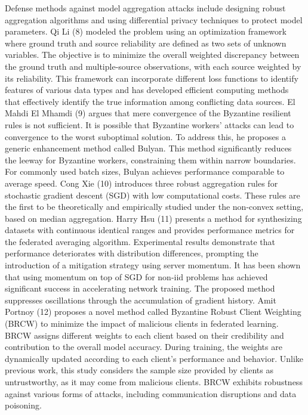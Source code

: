 \documentclass[conference]{IEEEtran}
\begin{document}
Defense methods against model aggregation attacks include designing robust aggregation algorithms and using differential privacy techniques to protect model parameters.
Qi Li (8) modeled the problem using an optimization framework where ground truth and source reliability are defined as two sets of unknown variables. The objective is to minimize the overall weighted discrepancy between the ground truth and multiple-source observations, with each source weighted by its reliability. This framework can incorporate different loss functions to identify features of various data types and has developed efficient computing methods that effectively identify the true information among conflicting data sources.
El Mahdi El Mhamdi (9) argues that mere convergence of the Byzantine resilient rules is not sufficient. It is possible that Byzantine workers' attacks can lead to convergence to the worst suboptimal solution. To address this, he proposes a generic enhancement method called Bulyan. This method significantly reduces the leeway for Byzantine workers, constraining them within narrow boundaries. For commonly used batch sizes, Bulyan achieves performance comparable to average speed.
Cong Xie (10) introduces three robust aggregation rules for stochastic gradient descent (SGD) with low computational costs. These rules are the first to be theoretically and empirically studied under the non-convex setting, based on median aggregation.
Harry Hsu (11) presents a method for synthesizing datasets with continuous identical ranges and provides performance metrics for the federated averaging algorithm. Experimental results demonstrate that performance deteriorates with distribution differences, prompting the introduction of a mitigation strategy using server momentum. It has been shown that using momentum on top of SGD for non-iid problems has achieved significant success in accelerating network training. The proposed method suppresses oscillations through the accumulation of gradient history.
Amit Portnoy (12) proposes a novel method called Byzantine Robust Client Weighting (BRCW) to minimize the impact of malicious clients in federated learning. BRCW assigns different weights to each client based on their credibility and contribution to the overall model accuracy. During training, the weights are dynamically updated according to each client's performance and behavior. Unlike previous work, this study considers the sample size provided by clients as untrustworthy, as it may come from malicious clients. BRCW exhibits robustness against various forms of attacks, including communication disruptions and data poisoning.
\end{document}
